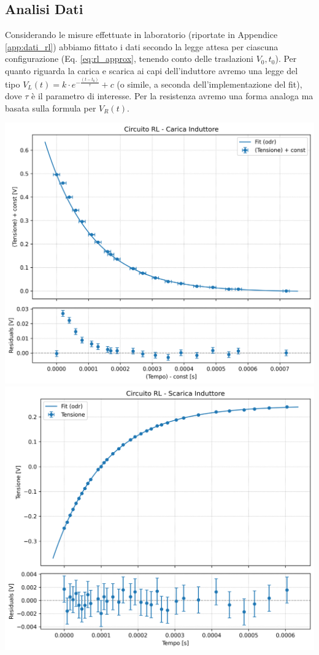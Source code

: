 \documentclass[a4paper]{article}
\begin{document}
\subsection{Analisi Dati}
Considerando le misure effettuate in laboratorio (riportate in Appendice \ref{app:dati_rl}) abbiamo fittato i dati secondo la legge attesa per ciascuna configurazione (Eq. \ref{eq:rl_approx}, tenendo conto delle traslazioni $V_0, t_0$). Per quanto riguarda la carica e scarica ai capi dell'induttore avremo una legge del tipo \( \mathit{V_L(t) = k \cdot e^{-\frac{(t-t_0)}{\mathit{\tau}}} + c}\) (o simile, a seconda dell'implementazione del fit), dove $\tau$ è il parametro di interesse. Per la resistenza avremo una forma analoga ma basata sulla formula per $V_R(t)$.
\begin{center}
    \includegraphics[width=0.9\linewidth]{grafici/rl_carica_induttore.png}
    \label{fig: rl carica induttore}
    \includegraphics[width=0.9\linewidth]{grafici/rl_scarica_induttore.png}

\end{center}
\end{document}
